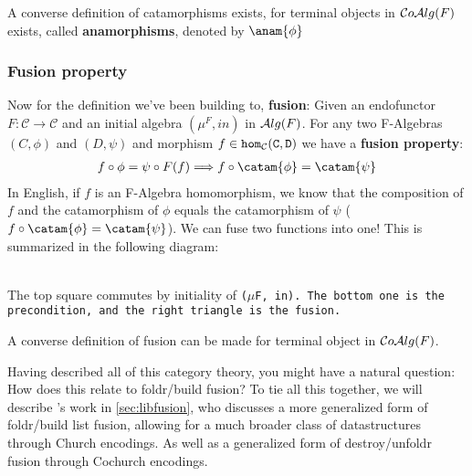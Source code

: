 A converse definition of catamorphisms exists, for terminal objects in $\mathcal{C}o\mathcal{A}lg(F)$ exists, called \textbf{anamorphisms}, denoted by $\anam{\phi}$

\subsubsection{Fusion property}\label{sec:fusion_prop}
Now for the definition we've been building to, \textbf{fusion}:
Given an endofunctor $F:\mathcal{C}\to\mathcal{C}$ and an initial algebra $(\mu^F,in)$ in $\mathcal{A}lg(F)$. For any two F-Algebras $(C,\phi)$ and $(D,\psi)$ and morphism $f\in\tt{hom}_\mathcal{C}(C,D)$ we have a \textbf{fusion property}: \begin{align*} f\circ\phi=\psi\circ F(f) \Longrightarrow f\circ\catam{\phi}=\catam{\psi} \end{align*}
In English, if $f$ is an F-Algebra homomorphism, we know that the composition of $f$ and the catamorphism of $\phi$ equals the catamorphism of $\psi$ ($f\circ\catam{\phi}=\catam{\psi}$). We can fuse two functions into one! This is summarized in the following diagram:
\begin{figure}[H]\vspace{-1em}\hfill
{}\hfill\null
\end{figure}\vspace{-2em}~\\
The top square commutes by initiality of \tt{($\mu$F, in)}. The bottom one is the precondition, and the right triangle is the fusion.

A converse definition of fusion can be made for terminal object in $\mathcal{C}o\mathcal{A}lg(F)$.

Having described all of this category theory, you might have a natural question: How does this relate to foldr/build fusion?
To tie all this together, we will describe \cite{Harper2011}'s work in \autoref{sec:libfusion}, who discusses a more generalized form of foldr/build list fusion, allowing for a much broader class of datastructures through Church encodings. As well as a generalized form of destroy/unfoldr fusion through Cochurch encodings.

